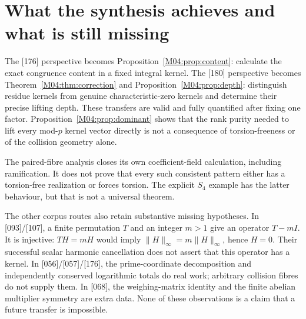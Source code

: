 \documentclass[11pt,a4paper,oneside]{report}
\theoremstyle{definition}
\theoremstyle{remark}
\begin{document}
\section{What the synthesis achieves and what is still missing}

The [176] perspective becomes Proposition~\ref{M04:prop:content}: calculate
the exact congruence content in a fixed integral kernel. The [180]
perspective becomes Theorem~\ref{M04:thm:correction} and
Proposition~\ref{M04:prop:depth}: distinguish residue kernels from genuine
characteristic-zero kernels and determine their precise lifting depth.
These transfers are valid and fully quantified after fixing one factor.
Proposition~\ref{M04:prop:dominant} shows that the rank purity needed to lift
every mod-$p$ kernel vector directly is not a consequence of
torsion-freeness or of the collision geometry alone.

The paired-fibre analysis closes its own coefficient-field calculation,
including ramification. It does not prove that every such consistent
pattern either has a torsion-free realization or forces torsion. The
explicit $S_4$ example has the latter behaviour, but that is not a
universal theorem.

The other corpus routes also retain substantive missing hypotheses.
In [093]/[107], a finite permutation $T$ and an integer $m>1$ give an
operator $T-mI$. It is injective: $TH=mH$ would imply
$\|H\|_\infty=m\|H\|_\infty$, hence $H=0$. Their successful scalar
harmonic cancellation does not assert that this operator has a kernel.
In [056]/[057]/[176], the prime-coordinate decomposition and independently
conserved logarithmic totals do real work; arbitrary collision fibres
do not supply them. In [068], the weighing-matrix identity and the
finite abelian multiplier symmetry are extra data. None of these
observations is a claim that a future transfer is impossible.
\end{document}
